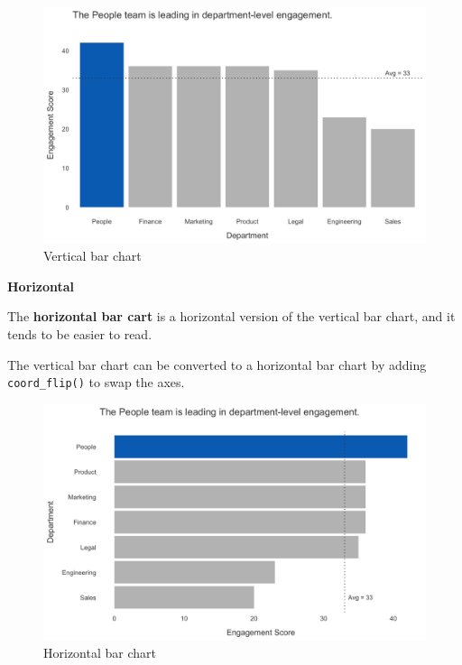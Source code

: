 \documentclass[
]{book}
\begin{document}
\begin{figure}

{\centering \includegraphics[width=1\linewidth]{graphics/vertical_bar_chart} 

}

\caption{Vertical bar chart}\label{fig:vbar-chart}
\end{figure}

\textbf{Horizontal}

The \textbf{horizontal bar cart} is a horizontal version of the vertical bar chart, and it tends to be easier to read.

The vertical bar chart can be converted to a horizontal bar chart by adding \texttt{coord\_flip()} to swap the axes.

\begin{figure}

{\centering \includegraphics[width=1\linewidth]{graphics/horizontal_bar_chart_1} 

}

\caption{Horizontal bar chart}\label{fig:hbar-chart}
\end{figure}
\end{document}

